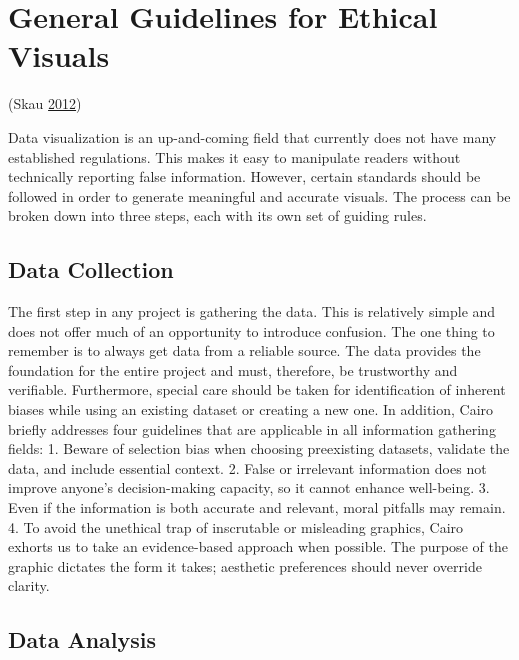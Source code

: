 \documentclass[]{book}
\begin{document}
\hypertarget{general-guidelines-for-ethical-visuals}{%
\section{General Guidelines for Ethical Visuals}\label{general-guidelines-for-ethical-visuals}}

(Skau \protect\hyperlink{ref-ethics_code}{2012})

Data visualization is an up-and-coming field that currently does not have many established regulations. This makes it easy to manipulate readers without technically reporting false information. However, certain standards should be followed in order to generate meaningful and accurate visuals. The process can be broken down into three steps, each with its own set of guiding rules.

\hypertarget{data-collection}{%
\subsection{Data Collection}\label{data-collection}}

The first step in any project is gathering the data. This is relatively simple and does not offer much of an opportunity to introduce confusion. The one thing to remember is to always get data from a reliable source. The data provides the foundation for the entire project and must, therefore, be trustworthy and verifiable. Furthermore, special care should be taken for identification of inherent biases while using an existing dataset or creating a new one. In addition, Cairo briefly addresses four guidelines that are applicable in all information gathering fields:
1. Beware of selection bias when choosing preexisting datasets, validate the data, and include essential context.
2. False or irrelevant information does not improve anyone's decision-making capacity, so it cannot enhance well-being.
3. Even if the information is both accurate and relevant, moral pitfalls may remain.
4. To avoid the unethical trap of inscrutable or misleading graphics, Cairo exhorts us to take an evidence-based approach when possible. The purpose of the graphic dictates the form it takes; aesthetic preferences should never override clarity.

\hypertarget{data-analysis}{%
\subsection{Data Analysis}\label{data-analysis}}
\end{document}
